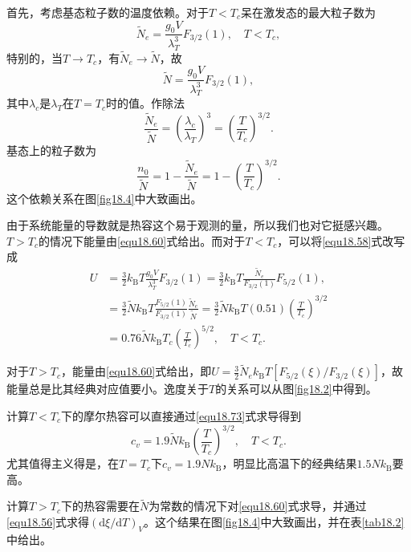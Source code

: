首先，考虑基态粒子数的温度依赖。对于$T<T_c$呆在激发态的最大粒子数为
\begin{equation}
\tilde N_e=\frac{g_0V}{\lambda_T^3}F_{3/2}(1),\quad T<T_c,
\end{equation}
特别的，当$T\rightarrow T_c$，有$\tilde N_e\rightarrow \tilde N$，故
\begin{equation}
\tilde N=\frac{g_0V}{\lambda_T^3}F_{3/2}(1),
\end{equation}
其中$\lambda_c$是$\lambda_T$在$T=T_c$时的值。作除法
\begin{equation}
\frac{\tilde N_e}{\tilde N}=\left(\frac{\lambda_c}{\lambda_T}\right)^3=\left(\frac{T}{T_c}\right)^{3/2}.
\end{equation}
基态上的粒子数为
\begin{equation}
\frac{n_0}{\tilde N}=1-\frac{\tilde N_e}{\tilde N}=1-\left(\frac{T}{T_c}\right)^{3/2}.
\end{equation}
这个依赖关系在图\ref{fig18.4}中大致画出。

由于系统能量的导数就是热容这个易于观测的量，所以我们也对它挺感兴趣。$T>T_c$的情况下能量由\eqref{equ18.60}式给出。而对于$T<T_c$，可以将\eqref{equ18.58}式改写成
\begin{equation}
\begin{aligned}
U &=\frac{3}{2}k_\text{B}T\frac{g_0V}{\lambda_T^3}F_{3/2}(1)=\frac{3}{2}k_\text{B}T\frac{\tilde N_e}{F_{3/2}(1)}F_{5/2}(1), \\
 &=\frac{3}{2}\tilde Nk_\text{B}T\frac{F_{5/2}(1)}{F_{3/2}(1)}\frac{\tilde N_e}{\tilde N}=\frac{3}{2}\tilde Nk_\text{B}T(0.51)\left(\frac{T}{T_c}\right)^{3/2} \\
 &=0.76\tilde Nk_\text{B}T_c\left(\frac{T}{T_c}\right)^{5/2},\quad T<T_c.
\end{aligned}
\label{equ18.73}
\end{equation}

对于$T>T_c$，能量由\eqref{equ18.60}式给出，即$U=\frac{3}{2}\tilde N_ek_\text{B}T[F_{5/2}(\xi)/F_{3/2}(\xi)]$，故能量总是比其经典对应值要小。逸度关于$T$的关系可以从图\ref{fig18.2}中得到。

计算$T<T_c$下的摩尔热容可以直接通过\eqref{equ18.73}式求导得到
\begin{equation}
c_v=1.9\tilde Nk_\text{B}\left(\frac{T}{T_c}\right)^{3/2},\quad T<T_c.
\end{equation}
尤其值得主义得是，在$T=T_c$下$c_v=1.9Nk_\text{B}$，明显比高温下的经典结果$1.5Nk_\text{B}$要高。

计算$T>T_c$下的热容需要在$\tilde N$为常数的情况下对\eqref{equ18.60}式求导，并通过\eqref{equ18.56}式求得$(\mathrm d\xi/\mathrm dT)_V$。这个结果在图\ref{fig18.4}中大致画出，并在表\ref{tab18.2}中给出。

